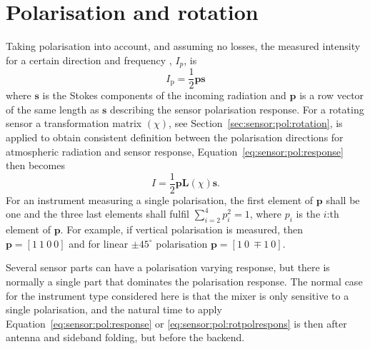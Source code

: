 \section{Polarisation and rotation}
\label{sec:sensor:pol}
Taking polarisation into account, and assuming no losses, the measured intensity for a certain direction and frequency , $I_p$, is
\begin{equation}
\label{eq:sensor:pol:response}
  I_\mathrm{p} = \frac{1}{2} \mathbf{p} \mathbf{s}
\end{equation}
where $\mathbf{s}$ is the Stokes components of the incoming radiation and $\mathbf{p}$ is a row vector of the same length as $\mathbf{s}$ describing the sensor polarisation response. For a rotating sensor a transformation matrix $(\chi)$, see Section~\ref{sec:sensor:pol:rotation}, is applied to obtain consistent definition between the polarisation directions for atmospheric radiation and sensor response, Equation~\ref{eq:sensor:pol:response} then becomes
\begin{equation}
\label{eq:sensor:pol:rotpolrespons}
  I = \frac{1}{2} \mathbf{p} \mathbf{L}(\chi) \mathbf{s}.
\end{equation}
For an instrument measuring a single polarisation, the first element of $\mathbf{p}$ shall be one and the three last elements shall fulfil $\sum_{i=2}^4 p_i^2 = 1$, where
$p_i$ is the $i$:th element of $\mathbf{p}$. For example, if vertical polarisation is measured, then $\mathbf{p}=[1\ 1\ 0\ 0]$ and for linear $\pm45^\circ$ polarisation $\mathbf{p}=[1\ 0\ \mp\!\!1\ 0]$.  

Several sensor parts can have a polarisation varying response, but there is normally a single part that dominates the polarisation response. The normal case for the instrument type considered here is that the mixer is only sensitive to a single polarisation, and the natural time to apply Equation~\ref{eq:sensor:pol:response} or \ref{eq:sensor:pol:rotpolrespons} is then after antenna and sideband folding, but before the backend. 


